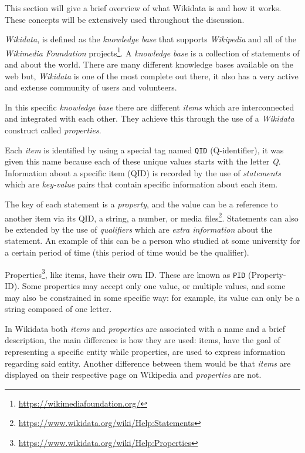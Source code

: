 \documentclass[epsfig,a4paper,11pt,titlepage,twoside,openany]{book}
\newcommand{\footurl}[1]{\footnote{\url{#1}}}
\begin{document}
This section will give a brief overview of what Wikidata is and how it works. These concepts will be extensively used throughout the discussion. 

\textit{Wikidata}, is defined as the \textit{knowledge base} that supports
\textit{Wikipedia} and all of the \textit{Wikimedia Foundation}
projects\footurl{https://wikimediafoundation.org/}. A \textit{knowledge base} is a collection of statements of and about the world. There are many different knowledge bases available on the web but, \textit{Wikidata} is one of the most complete out there, it also has a very active and extense community of users and volunteers. 

In this specific \textit{knowledge base} there are different \textit{items} which are interconnected and integrated with each other. They achieve this through the use of a \textit{Wikidata} construct called 
\textit{properties}. 

Each \textit{item} is identified by using a special tag named \texttt{QID} (Q-identifier), it was given this name because each of these unique values starts with the letter \textit{Q}. Information about a specific item (QID) is
recorded by the use of \textit{statements} which are \textit{key-value} pairs
that contain specific information about each item.

The key of each statement is a \textit{property}, and the value can be a reference to another item via its QID, a string, a number, or media
files\footurl{https://www.wikidata.org/wiki/Help:Statements}. Statements can
also be extended by the use of \textit{qualifiers} which are \textit{extra information} about the
statement. An example of this can be a person who studied at some university for
a certain period of time (this period of time would be the qualifier).

Properties\footurl{https://www.wikidata.org/wiki/Help:Properties}, like items,
have their own ID. These are known as \texttt{PID} (Property-ID). Some properties may accept only one value, or multiple values, and
some may also be constrained in some specific way: for example, its value can
only be a string composed of one letter.

In Wikidata both \textit{items} and \textit{properties} are associated with a name and a
brief description, the main difference is how they are used: items, have the
goal of representing a specific entity while properties, are used to express 
information regarding said entity. Another difference between them would be that \textit{items} are displayed on their respective page on Wikipedia and \textit{properties} are not.
\end{document}
